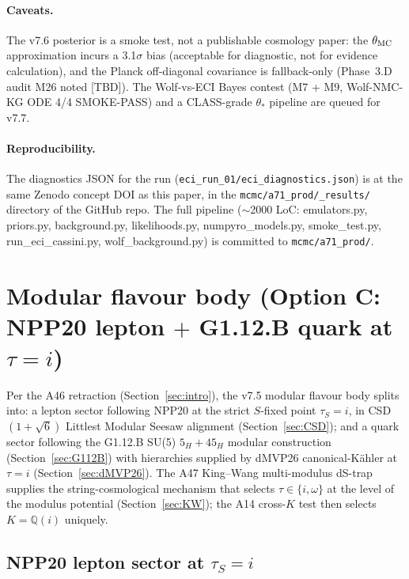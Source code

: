 \documentclass[a4paper,11pt]{article}
\newcommand{\Qi}{\mathbb{Q}(i)}
\theoremstyle{definition}
\theoremstyle{remark}
\begin{document}
\paragraph{Caveats.}
The v7.6 posterior is a smoke test, not a publishable cosmology
paper: the $\theta_{\rm MC}$ approximation incurs a 3.1$\sigma$
bias (acceptable for diagnostic, not for evidence calculation), and
the Planck off-diagonal covariance is fallback-only (Phase~3.D
audit M26 noted [TBD]).  The Wolf-vs-ECI Bayes contest
(M7 + M9, Wolf-NMC-KG ODE 4/4 SMOKE-PASS) and a CLASS-grade
$\theta_{*}$ pipeline are queued for v7.7.

\paragraph{Reproducibility.}
The diagnostics JSON for the run (\texttt{eci\_run\_01/eci\_diagnostics.json})
is at the same Zenodo concept DOI as this paper, in the
\texttt{mcmc/a71\_prod/\_results/} directory of the GitHub repo.
The full pipeline ($\sim$2000 LoC: emulators.py, priors.py,
background.py, likelihoods.py, numpyro\_models.py, smoke\_test.py,
run\_eci\_cassini.py, wolf\_background.py) is committed to
\texttt{mcmc/a71\_prod/}.

\section{Modular flavour body (Option C: NPP20 lepton $+$
         G1.12.B quark at $\tau=i$)}
\label{sec:flavour}

Per the A46 retraction (Section~\ref{sec:intro}), the v7.5 modular
flavour body splits into: a lepton sector following NPP20
\cite{NPP20} at the strict $S$-fixed point $\tau_S=i$, in
CSD$(1+\sqrt 6)$ Littlest Modular Seesaw alignment
(Section~\ref{sec:CSD}); and a quark sector following the
G1.12.B SU(5) $5_H+45_H$ modular construction
(Section~\ref{sec:G112B}) with hierarchies supplied by dMVP26
canonical-K\"ahler at $\tau=i$ (Section~\ref{sec:dMVP26}).  The
A47 King--Wang multi-modulus dS-trap supplies the
string-cosmological mechanism that selects $\tau\in\{i,\omega\}$
at the level of the modulus potential
(Section~\ref{sec:KW}); the A14 cross-$K$ test then selects
$K=\Qi$ uniquely.

\subsection{NPP20 lepton sector at $\tau_S=i$}
\label{sec:NPP20}
\end{document}
